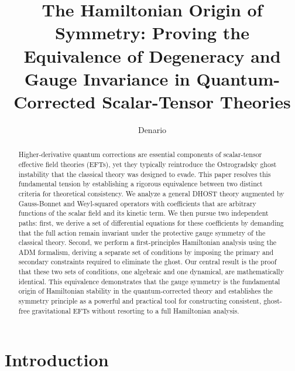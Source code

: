 \documentclass[twocolumn]{aastex631}
\begin{document}
\title{The Hamiltonian Origin of Symmetry: Proving the Equivalence of Degeneracy and Gauge Invariance in Quantum-Corrected Scalar-Tensor Theories}

\author{Denario}

\begin{abstract}
Higher-derivative quantum corrections are essential components of scalar-tensor effective field theories (EFTs), yet they typically reintroduce the Ostrogradsky ghost instability that the classical theory was designed to evade. This paper resolves this fundamental tension by establishing a rigorous equivalence between two distinct criteria for theoretical consistency. We analyze a general DHOST theory augmented by Gauss-Bonnet and Weyl-squared operators with coefficients that are arbitrary functions of the scalar field and its kinetic term. We then pursue two independent paths: first, we derive a set of differential equations for these coefficients by demanding that the full action remain invariant under the protective gauge symmetry of the classical theory. Second, we perform a first-principles Hamiltonian analysis using the ADM formalism, deriving a separate set of conditions by imposing the primary and secondary constraints required to eliminate the ghost. Our central result is the proof that these two sets of conditions, one algebraic and one dynamical, are mathematically identical. This equivalence demonstrates that the gauge symmetry is the fundamental origin of Hamiltonian stability in the quantum-corrected theory and establishes the symmetry principle as a powerful and practical tool for constructing consistent, ghost-free gravitational EFTs without resorting to a full Hamiltonian analysis.
\end{abstract}



\section{Introduction}
\label{sec:intro}
\end{document}
